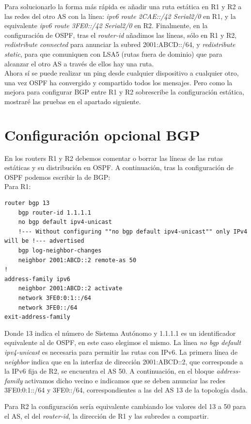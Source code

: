\documentclass{article}
\begin{document}
Para solucionarlo la forma más rápida es añadir una ruta estática en R1 y R2 a las redes del otro AS con la línea: \textit{ipv6 route 2CAE::/42 Serial2/0} en R1, y la equivalente \textit{ipv6 route 3FE0::/42 Serial2/0} en R2. Finalmente, en la configuración de OSPF, tras el \textit{router-id} añadimos las líneas, sólo en R1 y R2, \textit{redistribute connected} para anunciar la subred 2001:ABCD::/64, y \textit{redistribute static}, para que comuniquen con LSA5 (rutas fuera de dominio) que para alcanzar el otro AS a través de ellos hay una ruta.
\\

Ahora sí se puede realizar un ping desde cualquier dispositivo a cualquier otro, una vez OSPF ha convergido y compartido todos los mensajes. Pero como la mejora para configurar BGP entre R1 y R2 sobrescribe la configuración estática, mostraré las pruebas en el apartado siguiente.


\section{Configuración opcional BGP}
En los routers R1 y R2 debemos comentar o borrar las líneas de las rutas estáticas y su distribución en OSPF. A continuación, tras la configuración de OSPF podemos escribir la de BGP:
\\

Para R1:
\begin{lstlisting}
router bgp 13
	bgp router-id 1.1.1.1
	no bgp default ipv4-unicast
	!--- Without configuring ""no bgp default ipv4-unicast"" only IPv4 will be !--- advertised
	bgp log-neighbor-changes
	neighbor 2001:ABCD::2 remote-as 50
!
address-family ipv6
	neighbor 2001:ABCD::2 activate
	network 3FE0:0:1::/64
	network 3FE0::/64
exit-address-family
\end{lstlisting}

Donde 13 indica el número de Sistema Autónomo y 1.1.1.1 es un identificador equivalente al de OSPF, en este caso elegimos el mismo. La línea \textit{no bgp default ipv4-unicast} es necesaria para permitir las rutas con IPv6. La primera línea de \textit{neighbor} indica que en la interfaz de dirección 2001:ABCD::2, que corresponde a la IPv6 fija de R2, se encuentra el AS 50. A continuación, en el bloque \textit{address-family} activamos dicho vecino e indicamos que se deben anunciar las redes 3FE0:0:1::/64 y 3FE0::/64, correspondientes a las del AS 13 de la topología dada.

Para R2 la configuración sería equivalente cambiando los valores del 13 a 50 para el AS, el del \textit{router-id}, la dirección de R1 y las subredes a compartir.
\\
\end{document}
